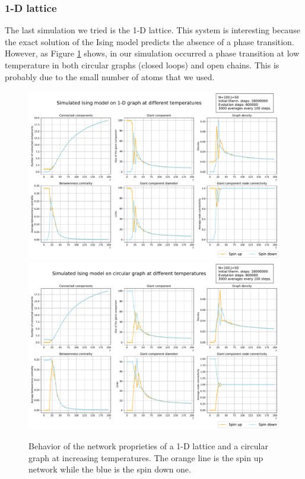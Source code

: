 \subsubsection*{1-D lattice}
The last simulation we tried is the 1-D lattice. This system is interesting because the exact solution of the Ising model predicts the absence of a phase transition. However, as Figure \ref{Fig:1-D} shows, in our simulation occurred a phase transition at low temperature in both circular graphs (closed loops) and open chains. This is probably due to the small number of atoms that we used.
\begin{figure}[H]
  \centering
  \includegraphics[width=.9\linewidth]{Network meausres/1-D100.pdf}
  \includegraphics[width=.9\linewidth]{Network meausres/Circular100.pdf}
    \caption{Behavior of the network proprieties of a 1-D lattice and a circular graph at increasing temperatures. The orange line is the spin up network while the blue is the spin down one.}
    \label{Fig:1-D}
\end{figure}
